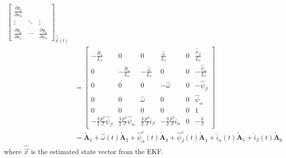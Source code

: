 \documentclass[11pt,a4paper]{scrartcl}
\numberwithin{equation}{section}
\theoremstyle{it}
\theoremstyle{definition}
\begin{document}
\begin{onehalfspace}
\begin{mybox}
\begin{equation}
\begin{aligned}
\begin{bmatrix}
				\frac{\partial g_1}{\partial x_n} \\[6pt]
				\vdots & \ddots & \vdots \\[6pt]
				\frac{\partial g_n}{\partial x_1} & \cdots & \frac{\partial 
					g_n}{\partial x_n}
			\end{bmatrix}_{\hat{\vec{x}}(t)} \\[8pt]
			&= \begin{bmatrix} 
				-\frac{R_s}{L_s} & 0 & 0 & \frac{\hat{\omega}}{L_s} & 0 & \frac{\hat{\psi}_\beta}{L_s} \\[6pt]			
				0 & -\frac{R_s}{L_s} & -\frac{\hat{\omega}}{L_s} & 0 & 0 & -\frac{\hat{\psi}_\alpha}{L_s} \\[6pt]
				0 & 0 & 0 & -\hat{\omega} & 0 & -\hat{\psi}_\beta \\[6pt]
				0 & 0 & \hat{\omega} & 0 & 0 & \hat{\psi}_\alpha \\[6pt]
				0 & 0 & 0 & 0 & 0 & 1 \\[6pt]
				-\frac{3}{2}\frac{p^2}{J}\hat{\psi}_\beta & \frac{3}{2}\frac{p^2}{J}\hat{\psi}_\alpha
				& \frac{3}{2}\frac{p^2}{J}\hat{i}_\beta & -\frac{3}{2}\frac{p^2}{J}\hat{i}_\alpha & 0 & -\frac{b}{J}
			\end{bmatrix}  \\[8pt]
			&=\tilde{\mathbf{A}}_1 + 
			\hat{\omega}(t) \tilde{\mathbf{A}}_2 + \hat{\psi}_\alpha^r(t) 
			\tilde{\mathbf{A}}_3 + \hat{\psi}_\beta^r(t) \tilde{\mathbf{A}}_4
			+ \hat{i}_\alpha(t) 
			\tilde{\mathbf{A}}_5 + \hat{i}_\beta(t) \tilde{\mathbf{A}}_6
		\end{aligned}
	\end{equation} 
	where $\hat{\vec{x}}$ is the estimated state vector from the EKF.
\end{mybox}


\end{onehalfspace}
\end{document}
